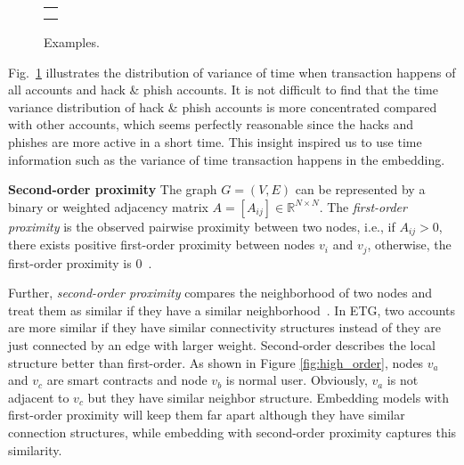 \begin{figure}[htbp]
\centering
\begin{tabular}{c}
	\subfigure[Histogram of time std for all nodes.]{
		\label{fig:high_order}
    
	}\\
	\subfigure[Histogram of time std for hack\&phish nodes.]{
		\label{fig:asymmetric}
    
	}
\end{tabular}
\caption{Examples.}
\label{fig:time_std}
\end{figure}

Fig.~\ref{fig:time_std} illustrates the distribution of variance of time when transaction happens of all accounts and hack \& phish accounts. It is not difficult to find that the time variance distribution of hack \& phish accounts is more concentrated compared with other accounts, which seems perfectly reasonable since the hacks and phishes are more active in a short time. This insight inspired us to use time information such as the variance of time transaction happens in the embedding.

\textbf{Second-order proximity} The graph $G=(V,E)$ can be represented by a binary or weighted adjacency matrix $A=[A_{ij}]\in \mathbb{R}^{N\times N}$. The \emph{first-order proximity} is the observed pairwise proximity between two nodes, i.e., if $A_{ij}>0$, there exists positive first-order proximity between nodes $v_i$ and $v_j$, otherwise, the first-order proximity is $0$~\cite{tang2015line}.

Further, \emph{second-order proximity} compares the neighborhood of two nodes and treat them as similar if they have a similar neighborhood~\cite{goyal2018graph}. In ETG, two accounts are more similar if they have similar connectivity structures instead of they are just connected by an edge with larger weight. Second-order describes the local structure better than first-order. As shown in Figure \ref{fig:high_order}, nodes $v_a$ and $v_c$ are smart contracts and node $v_b$ is normal user. Obviously, $v_a$ is not adjacent to $v_c$  but they have similar neighbor structure. Embedding models with first-order proximity will keep them far apart although they have similar connection structures, while embedding with second-order proximity captures this similarity.


